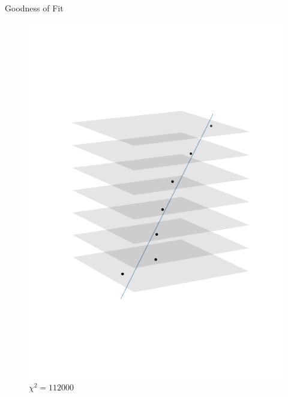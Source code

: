 \documentclass{beamer}
\begin{document}
\begin{frame}{Goodness of Fit}
\begin{minipage}{.32\textwidth}
    \end{minipage}
    \begin{minipage}{.32\textwidth}
    \begin{figure}[H]
	\centering
	\includegraphics[trim=0 80 0 80,clip,width=\textwidth]{example_112000.png}
	\caption*{\( \chi ^2 = 112000 \)}
    \end{figure}
    \end{minipage}
    \begin{minipage}{.32\textwidth}
    \begin{figure}[H]
	\centering

\end{figure}
\end{minipage}
\end{frame}
\end{document}
